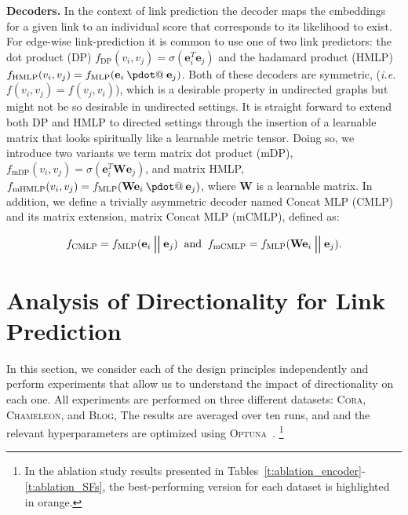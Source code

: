 \documentclass{article}
\makeatletter
\DeclareMathOperator*{\concat}{\scalerel*{\Vert}{\sum}}
\DeclareRobustCommand{\pdot}{\mathbin{\mathpalette\pdot@\relax}}\newcommand{\pdot@}[2]{\ooalign{$\m@th#1\circ$\cr\hidewidth$\m@th#1\cdot$\hidewidth\cr}}
\makeatother
\begin{document}
\textbf{Decoders.}\label{sec:decoder} In the context of link prediction the decoder maps the embeddings for a given link to an individual score that corresponds to its likelihood to exist. For edge-wise link-prediction it is common to use one of two link predictors: the dot product (DP) $f_{\operatorname{DP}}(v_i, v_j) = \sigma(\mathbf{e}_i^T \mathbf{e}_j)$ and the hadamard product (HMLP) $f_{\operatorname{HMLP}}(v_i, v_j) = f_{\operatorname{MLP}}(\mathbf{e}_i \pdot \mathbf{e}_j)$. Both of these decoders are symmetric, (\textit{i.e.} $f(v_i, v_j) = f(v_j, v_i)$), which is a desirable property in undirected graphs but might not be so desirable in undirected settings. It is straight forward to extend both DP and HMLP to directed settings through the insertion of a learnable matrix that looks spiritually like a learnable metric tensor. Doing so, we introduce two variants we term matrix dot product (mDP), $f_{\operatorname{mDP}}(v_i, v_j) = \sigma(\mathbf{e}_i^T \mathbf{W} \mathbf{e}_j)$, and matrix HMLP, $f_{\operatorname{mHMLP}}(v_i, v_j) = f_{\operatorname{MLP}}( \mathbf{W} \mathbf{e}_i \pdot \mathbf{e}_j )$, where $\mathbf{W}$ is a learnable matrix. In addition, we define a trivially asymmetric decoder named Concat MLP (CMLP) and its matrix extension, matrix Concat MLP (mCMLP), defined as:

\begin{equation}
f_{\operatorname{CMLP}}=f_{\operatorname{MLP}}(\mathbf{e}_i \concat \mathbf{e}_j) \;\; \textrm{and} \;\; f_{\operatorname{mCMLP}} = f_{\operatorname{MLP}}( \mathbf{W} \mathbf{e}_i \concat \mathbf{e}_j).
\end{equation}

\section{Analysis of Directionality for Link Prediction}\label{sec:analysis}
In this section, we consider each of the design principles independently and perform experiments that allow us to understand the impact of directionality on each one. All experiments are performed on three different datasets: \textsc{Cora}, \textsc{Chameleon}, and \textsc{Blog}, The results are averaged over ten runs, and and the relevant hyperparameters are optimized using \textsc{Optuna}~\citep{akiba2019optuna}. \footnote{
In the ablation study results presented in Tables~\ref{t:ablation_encoder}-\ref{t:ablation_SFs}, the best-performing version for each dataset is highlighted in \textcolor{junscolor1}{orange}.}
\end{document}
